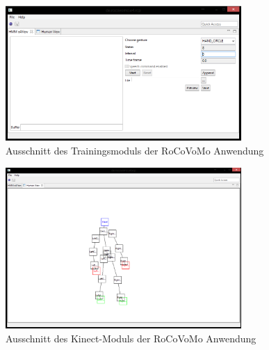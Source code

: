 \begin{figure}[htb]
\centering
\includegraphics[width=0.8\textwidth]{img/impl/recorder.png}
\caption[Ausschnitt des Trainingsmoduls der RoCoVoMo Anwendung]{Ausschnitt des Trainingsmoduls der RoCoVoMo Anwendung}
\label{fig:recorder}
\end{figure}

\begin{figure}[htb]
\centering
\includegraphics[width=0.8\textwidth]{img/impl/humanview.png}
\caption[Ausschnitt des Kinect-Moduls der RoCoVoMo Anwendung]{Ausschnitt des Kinect-Moduls der RoCoVoMo Anwendung}
\label{fig:view}
\end{figure}